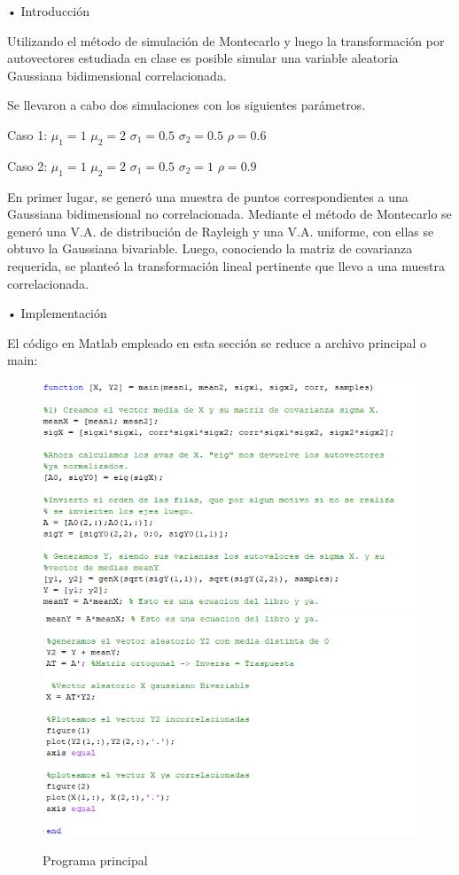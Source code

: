 \begin{large}
• Introducción\\
\end{large}

Utilizando el método de simulación de Montecarlo y luego la transformación por autovectores estudiada en clase es posible simular una variable aleatoria Gaussiana bidimensional correlacionada.

Se llevaron a cabo dos simulaciones con los siguientes parámetros.

\begin{center}
Caso 1: $\mu_{1} = 1$	 $\mu_{2} = 2$	 $\sigma_{1} = 0.5$	 $\sigma_{2} = 0.5$	 $\rho = 0.6$\label{eq:Parametros 1}

Caso 2: $\mu_{1} = 1$	 $\mu_{2} = 2$	 $\sigma_{1} = 0.5$	 $\sigma_{2} = 1$	 $\rho = 0.9$\label{eq:Parametros 2}

\end{center}

En primer lugar, se generó una muestra de puntos correspondientes a una Gaussiana bidimensional no correlacionada. Mediante el método de Montecarlo se generó una V.A. de distribución de Rayleigh y una V.A. uniforme, con ellas se obtuvo la Gaussiana bivariable. Luego, conociendo la matriz de covarianza requerida, se planteó la transformación lineal pertinente que llevo a una muestra correlacionada.
\\

\begin{large}
• Implementación\\
\end{large}

El código en Matlab empleado en esta sección se reduce a archivo principal o main:
\begin{figure}[H]
	\centering
	\includegraphics[width=0.6\linewidth]{./ImagenesEjercicio2/mainP1.PNG}
	\\
	\includegraphics[width=0.6\linewidth]{./ImagenesEjercicio2/mainP2.PNG}
	\caption{Programa principal}
	\label{fig:main}
\end{figure}


